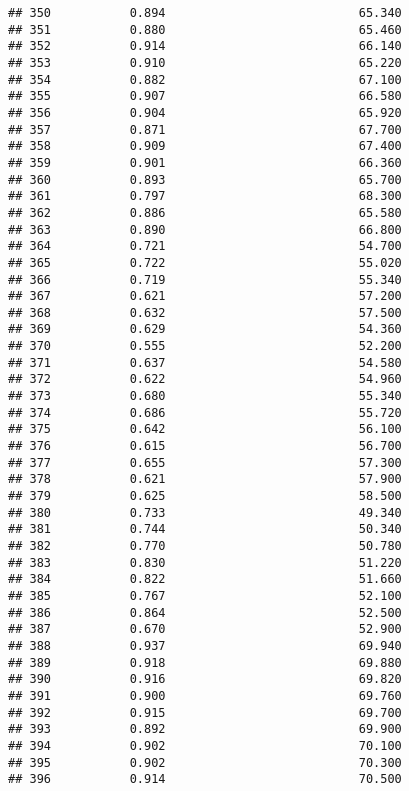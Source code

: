\documentclass[
]{article}
\begin{document}
\begin{verbatim}
## 350           0.894                           65.340
## 351           0.880                           65.460
## 352           0.914                           66.140
## 353           0.910                           65.220
## 354           0.882                           67.100
## 355           0.907                           66.580
## 356           0.904                           65.920
## 357           0.871                           67.700
## 358           0.909                           67.400
## 359           0.901                           66.360
## 360           0.893                           65.700
## 361           0.797                           68.300
## 362           0.886                           65.580
## 363           0.890                           66.800
## 364           0.721                           54.700
## 365           0.722                           55.020
## 366           0.719                           55.340
## 367           0.621                           57.200
## 368           0.632                           57.500
## 369           0.629                           54.360
## 370           0.555                           52.200
## 371           0.637                           54.580
## 372           0.622                           54.960
## 373           0.680                           55.340
## 374           0.686                           55.720
## 375           0.642                           56.100
## 376           0.615                           56.700
## 377           0.655                           57.300
## 378           0.621                           57.900
## 379           0.625                           58.500
## 380           0.733                           49.340
## 381           0.744                           50.340
## 382           0.770                           50.780
## 383           0.830                           51.220
## 384           0.822                           51.660
## 385           0.767                           52.100
## 386           0.864                           52.500
## 387           0.670                           52.900
## 388           0.937                           69.940
## 389           0.918                           69.880
## 390           0.916                           69.820
## 391           0.900                           69.760
## 392           0.915                           69.700
## 393           0.892                           69.900
## 394           0.902                           70.100
## 395           0.902                           70.300
## 396           0.914                           70.500

\end{verbatim}
\end{document}
